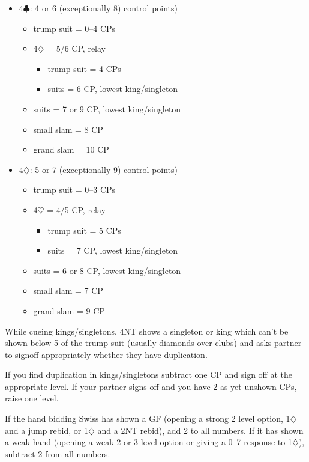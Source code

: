 \documentclass[a4paper,14pt]{extarticle}
\begin{document}
\begin{itemize}
\item 4$\clubsuit$: 4 or 6 (exceptionally 8) control points)
	\begin{itemize}
   \item trump suit = 0--4 CPs
   \item 4$\diamondsuit$ = 5/6 CP, relay
		\begin{itemize}
      \item trump suit = 4 CPs
      \item suits = 6 CP, lowest king/singleton
		\end{itemize}
   \item suits = 7 or 9 CP, lowest king/singleton
   \item small slam = 8 CP
   \item grand slam = 10 CP
	\end{itemize}

\newpage
\item 4$\diamondsuit$: 5 or 7 (exceptionally 9) control points)
	\begin{itemize}
   \item trump suit = 0--3 CPs
   \item 4$\heartsuit$ = 4/5 CP, relay
		\begin{itemize}
      \item trump suit = 5 CPs
      \item suits = 7 CP, lowest king/singleton
		\end{itemize}
   \item suits = 6 or 8 CP, lowest king/singleton
   \item small slam = 7 CP
   \item grand slam = 9 CP
	\end{itemize}
\end{itemize}

While cueing kings/singletons, 4NT shows a singleton or king which can't be
shown below 5 of the trump suit (usually diamonds over clubs) and asks partner
to signoff appropriately whether they have duplication.

If you find duplication in kings/singletons subtract one CP and sign off at the
appropriate level. If your partner signs off and you have 2 as-yet unshown CPs,
raise one level.

If the hand bidding Swiss has shown a GF (opening a strong 2 level option,
1$\diamondsuit$ and a jump rebid, or 1$\diamondsuit$ and a 2NT rebid), add 2 to
all numbers. If it has shown a weak hand (opening a weak 2 or 3 level option or
giving a 0--7 response to 1$\diamondsuit$), subtract 2 from all numbers.
\end{document}
